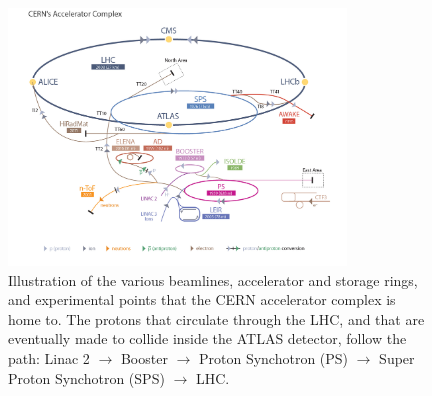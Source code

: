 \begin{figure}[!htb]
    \begin{center}
        \includegraphics[width=0.8\textwidth]{figures/chapter2/cern_accelerator_complex2}
        \caption{
            Illustration of the various beamlines, accelerator and storage rings, and experimental
            points that the CERN accelerator complex is home to.
            The protons that circulate through the LHC, and that are eventually made to collide inside
            the ATLAS detector, follow the path: Linac 2 $\rightarrow$ Booster $\rightarrow$ Proton Synchotron (PS)
            $\rightarrow$ Super Proton Synchotron (SPS) $\rightarrow$ LHC.
        }
        \label{fig:cern_complex}
    \end{center}
\end{figure}






